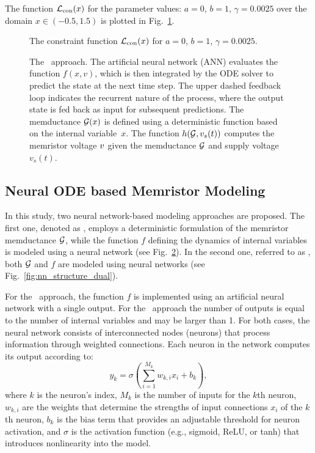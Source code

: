 \documentclass{ieeeaccess}
\begin{document}
The function \(\mathcal{L}_{\text{con}} (x)\) for the parameter values: \(a=0\), \(b=1\), \(\gamma=0.0025\) over the domain \(x \in (-0.5, 1.5)\) is plotted in Fig.~\ref{fig:constrains}.



\begin{figure}[!t]
  \centering
  \resizebox{2.5in}{!}{%
    
  }
  \caption{The constraint function \(\mathcal{L}_{\text{con}}(x)\) for \(a=0\), \(b=1\), \(\gamma=0.0025\).}
  \label{fig:constrains}
\end{figure}

\begin{figure}[htbp]
  \centering
  \resizebox{\columnwidth}{!}{%
    
  }
  \caption{The \MemODEOne\ approach. The artificial neural network (ANN) evaluates the function \(f\!(x,v)\), which is then integrated by the ODE solver to predict the state at the next time step. The upper dashed feedback loop indicates the recurrent nature of the process, where the output state is fed back as input for subsequent predictions. The memductance \(\mathcal{G}(x)\) is defined using a deterministic function based on the internal variable~\(x\). The function \(h(\mathcal{G}, v_s(t))\) computes the memristor voltage \(v\) given the memductance \(\mathcal{G}\) and supply voltage \(v_s(t)\).
  }
  \label{fig:nn_structure}
\end{figure}

\subsection{Neural ODE based Memristor Modeling}

In this study, two neural network-based modeling approaches are proposed. The first one, denoted as \textbf{\MemODEOne}, employs a deterministic formulation of the memristor memductance \(\mathcal{G}\), while the function \(f\) defining the dynamics of internal variables is modeled using a neural network (see Fig.~\ref{fig:nn_structure}). In the second one, referred to as \textbf{\MemODETwo}, both \(\mathcal{G}\) and \(f\) are modeled using neural networks (see Fig.~\ref{fig:nn_structure_dual}).

For the \MemODEOne\ approach, the function \(f\) is implemented using an artificial neural network with a single output. For the \MemODETwo\ approach the number of outputs is equal to the number of internal variables and may be larger than 1. For both cases, the neural network consists of interconnected nodes (neurons) that process information through weighted connections. Each neuron in the network computes its output according to:
\begin{equation}
  y_k = \sigma\left(\sum_{i=1}^{M_k} w_{k,i} x_i + b_k\right),
\end{equation}
where \(k\) is the neuron's index, \(M_k\) is the number of inputs for the \(k\)th neuron, \(w_{k,i}\) are the weights that determine the strengths of input connections \(x_i\) of the \(k\)th neuron, \(b_k\) is the bias term that provides an adjustable threshold for neuron activation, and \(\sigma\) is the activation function (e.g., sigmoid, ReLU, or tanh) that introduces nonlinearity into the model.
\end{document}
